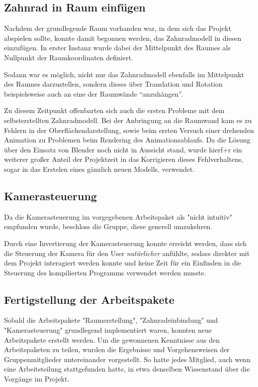 \documentclass{article}
\begin{document}
\subsection{Zahnrad in Raum einfügen}
Nachdem der grundlegende Raum vorhanden war, in dem sich das Projekt abspielen sollte, konnte damit begonnen werden, das Zahnradmodell in diesen einzufügen. 
In erster Instanz wurde dabei der Mittelpunkt des Raumes als Nullpunkt der Raumkoordinaten definiert. 

Sodann war es möglich, nicht nur das Zahnradmodell ebenfalls im Mittelpunkt des Raumes darzustellen, sondern dieses über Translation und Rotation beispielsweise auch an eine der Raumwände \enquote{anzuhängen}. 

Zu diesem Zeitpunkt offenbarten sich auch die ersten Probleme mit dem selbsterstellten Zahnradmodell. 
Bei der Anbringung an die Raumwand kam es zu Fehlern in der Oberflächendarstellung, sowie beim ersten Versuch einer drehenden Animation zu Problemen beim Rendering des Animationsablaufs. 
Da die Lösung über den Einsatz von Blender noch nicht in Aussicht stand, wurde hierf+r ein weiterer großer Anteil der Projektzeit in das Korrigieren dieses Fehlverhaltens, sogar in das Erstelen eines gänzlich neuen Modells, verwendet. 



\subsection{Kamerasteuerung}
Da die Kamerasteuerung im vorgegebenen Arbeitspaket als "nicht intuitiv" empfunden wurde, beschloss die Gruppe, diese generell umzukehren. 

Durch eine Invertierung der Kamerasteuerung konnte erreicht werden, dass sich die Steuerung der Kamera für den User \textit{natürlicher} anfühlte, sodass direkter mit dem Projekt interagiert werden konnte und keine Zeit für ein Einfinden in die Steuerung des kompilierten Programms verwendet werden musste. 


\subsection{Fertigstellung der Arbeitspakete}
Sobald die Arbeitspakete "Raumerstellung", "Zahnradeinbindung" und "Kamerasteuerung" grundlegend implementiert waren, konnten neue Arbeitspakete erstellt werden. 
Um die gewonnenen Kenntnisse aus den Arbeitspaketen zu teilen, wurden die Ergebnisse und Vorgehensweisen der Gruppenmitglieder untereinander vorgestellt. 
So hatte jedes Mitglied, auch wenn eine Arbeitsteilung stattgefunden hatte, in etwa denselben Wissenstand über die Vorgänge im Projekt. 
\end{document}
